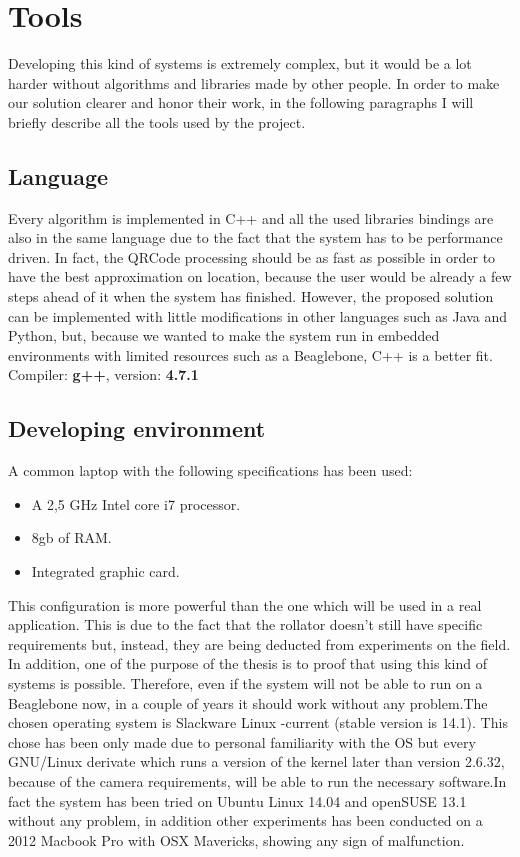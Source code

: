 \chapter{Tools}
Developing this kind of systems is extremely complex, but it would be a lot harder without algorithms and libraries made by other people.
In order to make our solution clearer and honor their work, in the following paragraphs I will briefly describe all the tools used by the project.

\section{Language}
Every algorithm is implemented in C++ and all the used libraries bindings are also in the same language due to the fact that the system has to be performance driven. In fact, the QRCode processing should be as fast as possible in order to have the best approximation on location, because the user would be already a few steps ahead of it when the system has finished. However, the proposed solution can be implemented with little modifications in other languages such as Java and Python, but, because we wanted to make the system run in embedded environments with limited resources such as a Beaglebone, C++ is a better fit.
\newline Compiler: \textbf{g++},  version: \textbf{4.7.1}


\section{Developing environment}
A common laptop with the following specifications has been used:
\begin{itemize}
  \item A 2,5 GHz Intel core i7 processor.
  \item 8gb of RAM.
  \item Integrated graphic card.
\end{itemize}
This configuration is more powerful than the one which will be used in a real application. This is due to the fact that the rollator doesn't still have specific requirements but, instead, they are being deducted from experiments on the field. In addition, one of the purpose of the thesis is to proof that using this kind of systems is possible. Therefore, even if the system will not be able to run on a Beaglebone now, in a couple of years it should work without any problem.The chosen operating system is Slackware Linux -current (stable version is 14.1). This chose has been only made due to personal familiarity with the OS but every GNU/Linux derivate which runs a version of the kernel later than version 2.6.32, because of the camera requirements, will be able to run the necessary software.In fact the system has been tried on Ubuntu Linux 14.04 and openSUSE 13.1 without any problem, in addition other experiments has been conducted on a 2012 Macbook Pro with OSX Mavericks, showing any sign of malfunction. 

